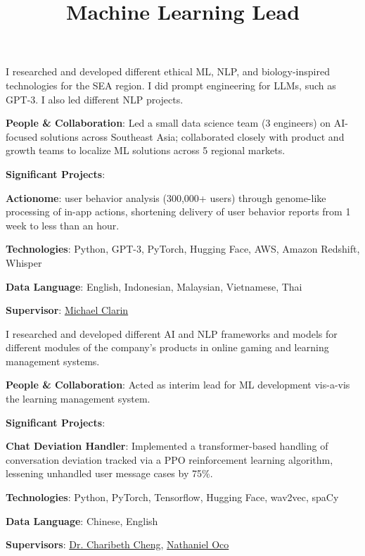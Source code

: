 \documentclass[margin]{res}
\newcommand{\SubItem}[1]{
    {\setlength\itemindent{15pt} \item[-] #1}
}
\begin{document}
\begin{resume}
\begin{position}
I researched and developed different ethical ML, NLP, and biology-inspired technologies for the SEA region. I did prompt engineering for LLMs, such as GPT-3. I also led different NLP projects.\\
\vspace{-3mm}
\begin{itemize}
    \item \textbf{People \& Collaboration}: Led a small data science team (3 engineers) on AI-focused solutions across Southeast Asia; collaborated closely with product and growth teams to localize ML solutions across 5 regional markets.
    \item \textbf{Significant Projects}:
    \SubItem{\textbf{Actionome}: user behavior analysis (300,000+ users) through genome-like processing of in-app actions, shortening delivery of user behavior reports from 1 week to less than an hour.}
    \item \textbf{Technologies}: Python, GPT-3, PyTorch, Hugging Face, AWS, Amazon Redshift, Whisper
    \item \textbf{Data Language}: English, Indonesian, Malaysian, Vietnamese, Thai
    \item \textbf{Supervisor}: \href{https://www.linkedin.com/in/michael-clarin-7571366}{Michael Clarin}
\end{itemize}
\end{position}

\title{\textbf{Machine Learning Lead}}
\begin{position}
I researched and developed different AI and NLP frameworks and models for different modules of the company's products in online gaming and learning management systems.\\
\vspace{-3mm}
\begin{itemize}
    \item \textbf{People \& Collaboration}: Acted as interim lead for ML development vis-a-vis the learning management system.
    \item \textbf{Significant Projects}:
    \SubItem{\textbf{Chat Deviation Handler}: Implemented a transformer-based handling of conversation deviation tracked via a PPO reinforcement learning algorithm, lessening unhandled user message cases by 75\%.}
    \item \textbf{Technologies}: Python, PyTorch, Tensorflow, Hugging Face, wav2vec, spaCy
    \item \textbf{Data Language}: Chinese, English
    \item \textbf{Supervisors}: \href{https://scholar.google.com.ph/citations?user=wKwXbiUAAAAJ}{Dr. Charibeth Cheng}, \href{https://scholar.google.com.ph/citations?user=ICq-zukAAAAJ}{Nathaniel Oco}
\end{itemize}
\end{position}


\end{resume}
\end{document}
